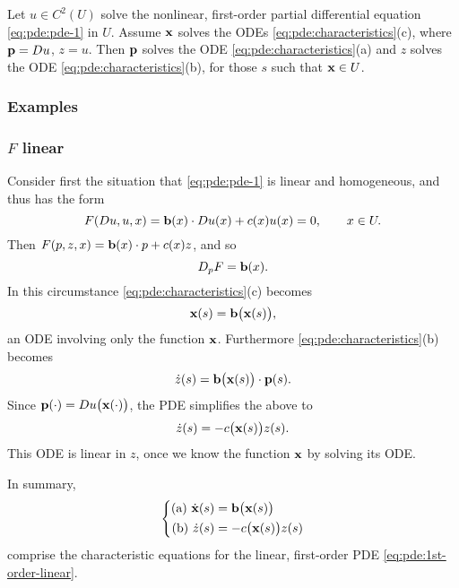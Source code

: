 \begin{theorem}
  Let \(u\in C^2(U)\) solve the nonlinear, first-order partial differential
  equation \eqref{eq:pde:pde-1} in \(U\). Assume \(\mathbf{x}\) solves the ODEs
  \eqref{eq:pde:characteristics}\textnormal{(c)}, where \(\mathbf{p}=Du\),
  \(z=u\). Then \(\mathbf{p}\) solves the ODE
  \eqref{eq:pde:characteristics}\textnormal{(a)} and \(z\) solves the ODE
  \eqref{eq:pde:characteristics}\textnormal{(b)}, for those \(s\) such that
  \(\mathbf{x}\in U\).
\end{theorem}
\subsubsection{Examples}
\subsubsection[\(F\) linear]{\(F\)  linear}
Consider first the situation that \eqref{eq:pde:pde-1} is linear and
homogeneous, and thus has the form
\[
  F(Du,u,x)=\mathbf{b}(x)\cdot D u(x)+c(x)u(x)=0,\qquad x\in U.
\]
Then \(F(p,z,x)=\mathbf{b}(x)\cdot p+c(x)z\), and so
\[
  D_pF=\mathbf{b}(x).
\]
In this circumstance \eqref{eq:pde:characteristics}(c) becomes
\[
  \mathbf{x}(s)=\mathbf{b}\bigl(\mathbf{x}(s)\bigr),
\]
an ODE involving only the function \(\mathbf{x}\). Furthermore
\eqref{eq:pde:characteristics}(b) becomes
\begin{equation}
  \label{eq:pde:1st-order-linear}
  \dot z(s)=\mathbf{b}\bigl(\mathbf{x}(s)\bigr)\cdot\mathbf{p}(s).
\end{equation}
Since \(\mathbf{p}(\cdot)=Du\bigl(\mathbf{x}(\cdot)\bigr)\), the PDE simplifies the
above to
\[
  \dot z(s)=-c\bigl(\mathbf{x}(s)\bigr)z(s).
\]
This ODE is linear in \(z\), once we know the function \(\mathbf{x}\) by solving
its ODE.

In summary,
\begin{equation}
  \label{eq:pde:1st-order-linear-chars}
  \left\{
    \begin{aligned}
      \text{(a) }\dot{\mathbf{x}}(s)&=\mathbf{b}\bigl( \mathbf{x}(s) \bigr)\\
      \text{(b) }\dot z(s)&=-c\bigl(\mathbf{x}(s)\bigr)z(s)
    \end{aligned}
  \right.
\end{equation}
comprise the characteristic equations for the linear, first-order PDE
\eqref{eq:pde:1st-order-linear}.

